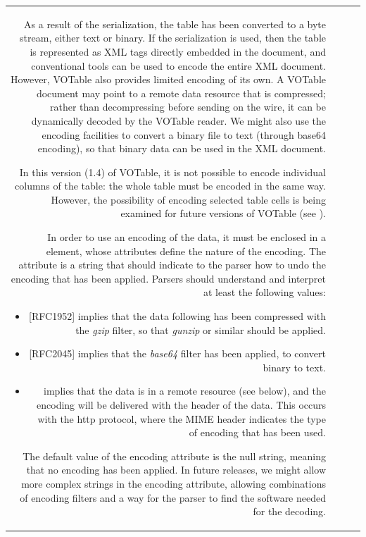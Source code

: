 \begin{tabular}{RRCp{0.8\textwidth}}
\begin{center}
{As a result of the serialization, the table has been converted to
a byte stream, either text or binary. If the {}
serialization is used, then the table is represented as XML tags 
directly  embedded in the document,
and conventional tools can be used to encode the entire XML document.
However, VOTable also provides limited encoding of its own. 
A VOTable document may point to a remote data resource that is compressed; 
rather than decompressing before sending on the wire, it can be dynamically
decoded by the VOTable reader. We might also use the encoding facilities to 
convert a binary file to text (through base64 encoding), so that binary 
data can be used in the XML document.

In this version (1.4) of VOTable, it is not possible to encode
individual columns of the table: the whole table must be encoded in
the same way. However, the possibility of encoding selected table cells
is  being examined for future versions of VOTable
(see ).

In order to use an encoding of the data, it must be enclosed in a
{}
element, whose attributes define the nature of the encoding. The
{}
attribute is a string that should indicate to the parser how to undo
the encoding that has been applied. Parsers should understand and
interpret at least the following values:
\begin{itemize}
        \item {} [RFC1952]
        implies that the data following has been compressed with the {\em gzip}
        filter, so that {\em gunzip} or similar should be applied.
        \item {} [RFC2045]
        implies that the {\em base64} filter has been applied, to convert binary
        to text.
        \item {}
        implies that the data is in a remote resource (see below), and the
        encoding will be delivered with the header of the data.
        This occurs with the http protocol, where the MIME header indicates 
        the type of encoding that has been used.
\end{itemize}

\noindent The default value of the encoding attribute is the null string, 
meaning that no encoding has been
applied. In future releases, we might allow more complex strings in
the encoding attribute, allowing combinations of encoding filters and
a way for the parser to find the software needed for the decoding.

}
\end{center}
\end{tabular}
